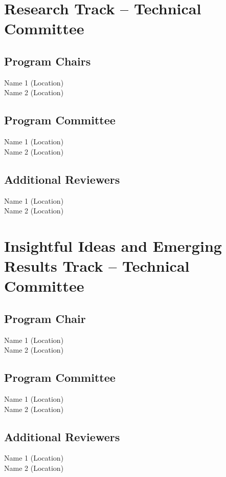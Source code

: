 \chapter*{Research Track -- Technical Committee}
\vspace{-.3cm}

\section*{Program Chairs}
\vspace{-.3cm}
Name 1 (Location)\\
Name 2 (Location)


\section*{Program Committee}
\vspace{-.3cm}
Name 1 (Location)\\
Name 2 (Location)

\section*{Additional Reviewers}
\vspace{-.3cm}
Name 1 (Location)\\
Name 2 (Location)


\cleardoublepage
\chapter*{Insightful Ideas and Emerging Results Track -- Technical Committee}
\vspace{-.3cm}

\section*{Program Chair}
\vspace{-.3cm}
Name 1 (Location)\\
Name 2 (Location)

\section*{Program Committee}
\vspace{-.3cm}
Name 1 (Location)\\
Name 2 (Location)

\section*{Additional Reviewers}
\vspace{-.3cm}
Name 1 (Location)\\
Name 2 (Location)